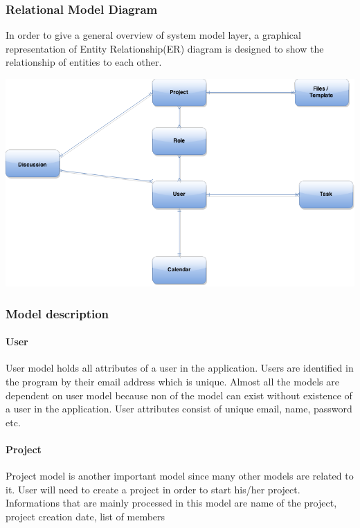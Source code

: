 \subsubsection{Relational Model Diagram}

In order to give a general overview of system model layer, a graphical representation of Entity Relationship(ER) diagram is designed to show the relationship of entities to each other.



\begin{center}
\includegraphics[scale=0.3]{./img/dsgn_img/RMA.png}
	
\end{center}

\subsubsection{Model description}
\paragraph{User}
User model holds all attributes of a user in the application. Users are identified in the program by their email address which is unique. Almost all the models are dependent on user model because non of the model can exist without existence of a user in the application. User attributes consist of unique email, name, password etc.

\paragraph{Project}

Project model is another important model since many other models are related to it. User will need to create a project in order to start his/her project. Informations that are mainly processed in this model are name of the project, project creation date, list of members

